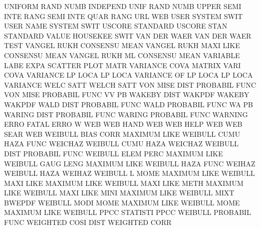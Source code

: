 UNIFORM  RAND NUMB                      INDEPEND UNIF RAND NUMB
UPPER    SEMI INTE RANG                 SEMI     INTE QUAR RANG
URL                                     WEB
USER                                    SYSTEM   SWIT
USER     NAME                           SYSTEM   SWIT
USCORE                                  STANDARD
USCORE   STAN                           STANDARD
VALUE                                   HOUSEKEE SWIT
VAN      DER  WAER                      VAN      DER  WAER TEST
VANGEL   RUKH                           CONSENSU MEAN
VANGEL   RUKH MAXI LIKE                 CONSENSU MEAN
VANGEL   RUKH ML                        CONSENSU MEAN
VARIABLE LABE EXPA                      SCATTER  PLOT MATR
VARIANCE COVA                           MATRIX   VARI COVA
VARIANCE LP   LOCA                      LP       LOCA
VARIANCE OF   LP   LOCA                 LP       LOCA
VARIANCE WELC SATT                      WELCH    SATT
VON      MISE DIST                      PROBABIL FUNC
VON      MISE                           PROBABIL FUNC
VV                                      PB
WAKEBY   DIST                           WAKPDF
WAKEBY                                  WAKPDF
WALD     DIST                           PROBABIL FUNC
WALD                                    PROBABIL FUNC
WA                                      PB
WARING   DIST                           PROBABIL FUNC
WARING                                  PROBABIL FUNC
WARNING  ERRO                           FATAL    ERRO
W                                       WEB
WEB      HAND                           WEB
WEB      HELP                           WEB
WEB      SEAR                           WEB
WEIBULL  BIAS CORR                      MAXIMUM  LIKE
WEIBULL  CUMU HAZA FUNC                 WEICHAZ
WEIBULL  CUMU HAZA                      WEICHAZ
WEIBULL  DIST                           PROBABIL FUNC
WEIBULL  ELEM PERC                      MAXIMUM  LIKE
WEIBULL  GAUG LENG                      MAXIMUM  LIKE
WEIBULL  HAZA FUNC                      WEIHAZ
WEIBULL  HAZA                           WEIHAZ
WEIBULL  L    MOME                      MAXIMUM  LIKE
WEIBULL  MAXI LIKE                      MAXIMUM  LIKE
WEIBULL  MAXI LIKE METH                 MAXIMUM  LIKE
WEIBULL  MAXI LIKE MINI                 MAXIMUM  LIKE
WEIBULL  MIXT                           BWEPDF
WEIBULL  MODI MOME                      MAXIMUM  LIKE
WEIBULL  MOME                           MAXIMUM  LIKE
WEIBULL  PPCC                           STATISTI PPCC
WEIBULL                                 PROBABIL FUNC
WEIGHTED COSI DIST                      WEIGHTED CORR
